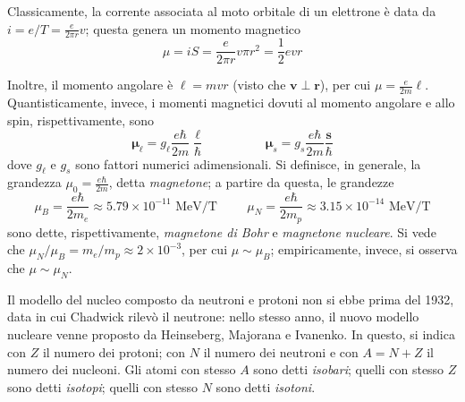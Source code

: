 \documentclass[11pt, a4paper]{scrartcl}
\theoremstyle{style}
\numberwithin{equation}{subsection}
\begin{document}
\begin{itemize}
	\begin{center}
		\begin{minipage}
			{.6\columnwidth}
		Classicamente, la corrente associata al moto orbitale di un elettrone \`e data da $i = e / T = \frac{e}{2\pi r } v$; questa genera un momento magnetico 
		\[
		\mu  = i S = \frac{e}{2\pi r } v \pi r^2 = \frac{1}{2} e v r
		\] 
		\end{minipage}
		\hfill
		\begin{minipage}
			{.3\columnwidth}
		\centering
		\end{minipage}
	\end{center}
		Inoltre, il momento angolare \`e $\ell = mvr$ (visto che $\mathbf{v} \perp \mathbf{r} $), per cui $\mu = \frac{e}{2m}\ell $.
		Quantisticamente, invece, i momenti magnetici dovuti al momento angolare e allo spin, rispettivamente, sono
		\[
		\pmb{\mu } _\ell = g _\ell  \frac{e\hbar }{2m}\frac{\pmb{\ell } }{\hbar }\hspace{2cm}\pmb{\mu } _s = g _s  \frac{e\hbar }{2m}\frac{\mathbf{s} }{\hbar }
		\] 
	dove $g_\ell $ e $g_s$ sono fattori numerici adimensionali. 
	Si definisce, in generale, la grandezza $\mu _0 = \frac{e\hbar }{2m}$, detta \textit{magnetone}; a partire da questa, le grandezze
	\[
	\mu _B = \frac{e\hbar }{2m_e} \approx 5.79 \times 10^{-11} \text{ MeV}/\text{T} \hspace{1cm} \mu _N = \frac{e\hbar }{2m_p} \approx 3.15 \times 10^{-14} \text{ MeV}/\text{T}
	\] 
	sono dette, rispettivamente, \textit{magnetone di Bohr} e \textit{magnetone nucleare}.
	Si vede che $\mu _N / \mu _B = m_e / m_p \approx 2 \times 10^{-3}$, per cui $\mu \sim \mu _B$; empiricamente, invece, si osserva che $\mu \sim \mu _N$.
\end{itemize}
Il modello del nucleo composto da neutroni e protoni non si ebbe prima del 1932, data in cui Chadwick rilev\`o il neutrone: nello stesso anno, il nuovo modello nucleare venne proposto da Heinseberg, Majorana e Ivanenko.
In questo, si indica con $Z$ il numero dei protoni; con $N$ il numero dei neutroni e con $A = N+Z$ il numero dei nucleoni.
Gli atomi con stesso $A$ sono detti \textit{isobari}; quelli con stesso $Z$ sono detti \textit{isotopi}; quelli con stesso $N$ sono detti \textit{isotoni}.
\end{document}
